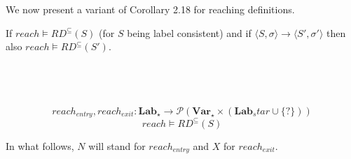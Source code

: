 \documentclass[a4wide,12pt]{article}
\theoremstyle{definition}
\theoremstyle{plain}
\theoremstyle{remark}
\def\pset#1{\mathcal{P}(#1)}
\def\const#1{\mathopen{\langle}#1\mathclose{\rangle}} %
\def\pair#1{\const{#1}}
\def\Lab {\mathbf{Lab}}
\def\Var {\mathbf{Var}}
\begin{document}
We now present a variant of Corollary 2.18 for reaching definitions.

If $reach \models RD^\subseteq(S)$ (for $S$ being label consistent) and
if $\pair{S,\sigma} \to \pair{S', \sigma'}$ then also $reach \models RD^\subseteq(S')$.



\subsection{~}

\[reach_{entry}, reach_{exit} : \Lab_\star \to \pset{\Var_\star \times (\Lab_star \cup \{?\})}\]
\[reach \models RD^{\subseteq}(S)\]

In what follows, $N$ will stand for $reach_{entry}$ and $X$ for $reach_{exit}$. 
\end{document}
